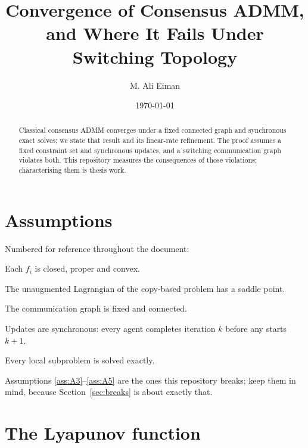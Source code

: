 \documentclass[11pt]{article}
\title{Convergence of Consensus ADMM, and Where It Fails Under Switching Topology}
\author{M. Ali Eiman}
\date{\today}
\begin{document}
\maketitle

\begin{abstract}
Classical consensus ADMM converges under a fixed connected graph and synchronous exact
solves; we state that result and its linear-rate refinement. The proof assumes a fixed
constraint set and synchronous updates, and a switching communication graph violates both.
This repository measures the consequences of those violations; characterising them is
thesis work.
\end{abstract}

\section{Assumptions}
\label{sec:assumptions}

Numbered for reference throughout the document:

\begin{assumption}
\label{ass:A1}
Each $f_i$ is closed, proper and convex.
\end{assumption}

\begin{assumption}
\label{ass:A2}
The unaugmented Lagrangian of the copy-based problem has a saddle point.
\end{assumption}

\begin{assumption}
\label{ass:A3}
The communication graph is fixed and connected.
\end{assumption}

\begin{assumption}[synchrony]
\label{ass:A4}
Updates are synchronous: every agent completes iteration $k$ before any starts $k+1$.
\end{assumption}

\begin{assumption}
\label{ass:A5}
Every local subproblem is solved exactly.
\end{assumption}

Assumptions \ref{ass:A3}--\ref{ass:A5} are the ones this repository breaks; keep them in
mind, because Section~\ref{sec:breaks} is about exactly that.

\section{The Lyapunov function}
\end{document}

